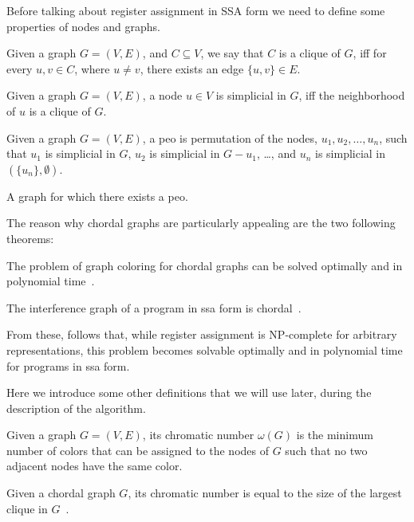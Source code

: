 Before talking about register assignment in SSA form we need to define some properties of nodes and graphs.

\begin{definition}[Clique]\label{def:clique}
  Given a graph $G = (V, E)$, and $C \subseteq V$, we say that $C$ is a clique of $G$, iff for every $u, v \in C$, where $u \neq v$, there exists an edge $\{ u, v \} \in E$.
\end{definition}

\begin{definition}\label{def:simplicial}
  Given a graph $G = (V, E)$, a node $u \in V$ is simplicial in $G$, iff the neighborhood of $u$ is a clique of $G$.
\end{definition}

\begin{definition}
  Given a graph $G = (V, E)$, a \gls{peo} is permutation of the nodes, $u_1, u_2, \dots, u_n$, such that $u_1$ is simplicial in $G$, $u_2$ is simplicial in $G - u_1$, \dots, and $u_n$ is simplicial in $(\{ u_n \}, \emptyset)$.
\end{definition}

\begin{definition}\label{def:chordal}
  A graph for which there exists a \gls{peo}.
\end{definition}

The reason why chordal graphs are particularly appealing are the two following theorems:

\begin{theorem}
  The problem of graph coloring for chordal graphs can be solved optimally and in polynomial time~\cite{golumbic2004algorithmic}.
\end{theorem}

\begin{theorem}
  The interference graph of a program in \gls{ssa} form is chordal~\cite{HGG:2006:RA-SSA}.
\end{theorem}

From these, follows that, while register assignment is NP-complete for arbitrary representations, this problem becomes solvable optimally and in polynomial time for programs in \gls{ssa} form.

Here we introduce some other definitions that we will use later, during the description of the algorithm.

\begin{definition}\label{def:chromatic}
  Given a graph $G = (V, E)$, its chromatic number $\omega(G)$ is the minimum number of colors that can be assigned to the nodes of $G$ such that no two adjacent nodes have the same color.
\end{definition}

\begin{theorem}\label{thm:chordal-chromatic}
  Given a chordal graph $G$, its chromatic number is equal to the size of the largest clique in $G$~\cite{golumbic2004algorithmic}.
\end{theorem}